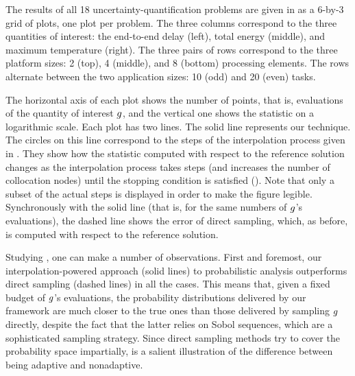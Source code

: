 
The results of all 18 uncertainty-quantification problems are given in
 as a 6-by-3 grid of plots, one plot per problem. The three
columns correspond to the three quantities of interest: the end-to-end delay
(left), total energy (middle), and maximum temperature (right). The three pairs
of rows correspond to the three platform sizes: 2 (top), 4 (middle), and 8
(bottom) processing elements. The rows alternate between the two application
sizes: 10 (odd) and 20 (even) tasks.

The horizontal axis of each plot shows the number of points, that is,
evaluations of the quantity of interest $g$, and the vertical one shows the
 statistic on a logarithmic scale. Each plot has two lines. The solid
line represents our technique. The circles on this line correspond to the steps
of the interpolation process given in . They show how the
 statistic computed with respect to the reference solution changes as the
interpolation process takes steps (and increases the number of collocation
nodes) until the stopping condition is satisfied (). Note that
only a subset of the actual steps is displayed in order to make the figure
legible. Synchronously with the solid line (that is, for the same numbers of
$g$'s evaluations), the dashed line shows the error of direct sampling, which,
as before, is computed with respect to the reference solution.

Studying , one can make a number of observations. First and
foremost, our interpolation-powered approach (solid lines) to probabilistic
analysis outperforms direct sampling (dashed lines) in all the cases. This means
that, given a fixed budget of $g$'s evaluations, the probability distributions
delivered by our framework are much closer to the true ones than those delivered
by sampling $g$ directly, despite the fact that the latter relies on Sobol
sequences, which are a sophisticated sampling strategy. Since direct sampling
methods try to cover the probability space impartially,  is a
salient illustration of the difference between being adaptive and nonadaptive.

